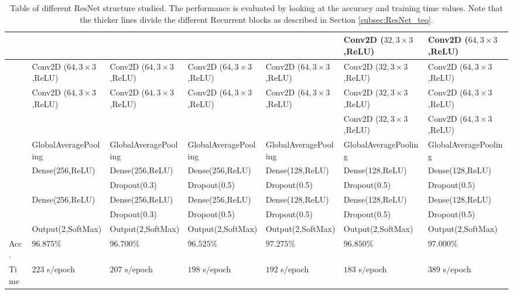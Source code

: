 \begin{table}
\begin{tabular}{l|l|l|l|l|l|l}
         & &  &  &  & Conv2D ($32,3\times3$,ReLU) & Conv2D ($64,3\times3$,ReLU) \\
         \midrule
         
         &Conv2D ($64,3\times3$,ReLU) & Conv2D ($64,3\times3$,ReLU) & Conv2D ($64,3\times3$,ReLU) & Conv2D ($64,3\times3$,ReLU) & Conv2D ($32,3\times3$,ReLU) & Conv2D ($64,3\times3$,ReLU) \\
         
         &Conv2D ($64,3\times3$,ReLU) & Conv2D ($64,3\times3$,ReLU) & Conv2D ($64,3\times3$,ReLU) & Conv2D ($64,3\times3$,ReLU) & Conv2D ($32,3\times3$,ReLU) & Conv2D ($64,3\times3$,ReLU) \\
         
         & &  &  &  & Conv2D ($32,3\times3$,ReLU) & Conv2D ($64,3\times3$,ReLU) \\
         \midrule         
         
         &GlobalAveragePooling & GlobalAveragePooling & GlobalAveragePooling & GlobalAveragePooling & GlobalAveragePooling & GlobalAveragePooling \\
         
         &Dense(256,ReLU) & Dense(256,ReLU) & Dense(256,ReLU) & Dense(128,ReLU) & Dense(128,ReLU) & Dense(128,ReLU) \\
         
         & & Dropout(0.3) & Dropout(0.5) & Dropout(0.5) & Dropout(0.5) & Dropout(0.5) \\
         
         &Dense(256,ReLU) & Dense(256,ReLU) & Dense(256,ReLU) & Dense(128,ReLU) & Dense(128,ReLU) & Dense(128,ReLU) \\
         
         & & Dropout(0.3) & Dropout(0.5) & Dropout(0.5) & Dropout(0.5) & Dropout(0.5) \\
         
         &Output(2,SoftMax) & Output(2,SoftMax) & Output(2,SoftMax) & Output(2,SoftMax) & Output(2,SoftMax) & Output(2,SoftMax) \\
         \midrule
         Acc. & $96.875\%$ & $96.700\%$ & $96.525\%$ & $97.275\%$ & $96.850\%$ & $97.000\%$ \\
         Time & $223$ s$/$epoch &  $207$ s$/$epoch & $198$ s$/$epoch & $192$ s$/$epoch & $183$ s$/$epoch & $389$ s$/$epoch\\
         \bottomrule
    \end{tabular}
    \caption{Table of different ResNet structure studied. The performance is evaluated by looking at the accuracy and training time values. Note that the thicker lines divide the different Recurrent blocks as described in Section \ref{subsec:ResNet_teo}.}
    \label{fig:ResNet-tested}
\end{table}

